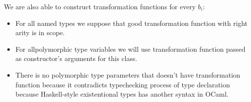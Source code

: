 \documentclass[acmsmall,review,anonymous]{acmart}\settopmatter{printfolios=true,printccs=false,printacmref=false}
\let\listinline\lstinline
\begin{document}
We are also able to construct transformation functions for every $b_i$: 
\begin{itemize}
 \item For all named types we suppose that good transformation function with right arity is in scope.
 \item For allpolymorphic type variables we will use transformation function passed as constructor's arguments for this class.
 \item There is no polymorphic type parameters that doesn't have transformation function because it contradicts typechecking process of type declaration because Haskell-style existentional types has another syntax in OCaml.
\end{itemize}

% 
% 
\end{document}
